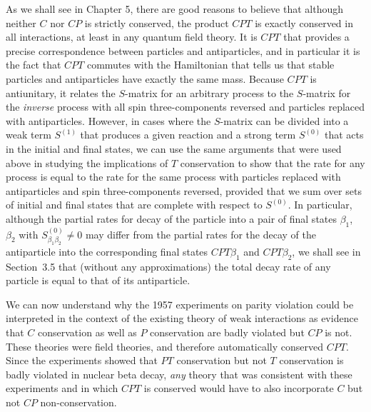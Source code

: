 As we shall see in Chapter 5, there are good reasons to believe that although neither
$C$ nor $CP$ is strictly conserved, the product $CPT$ is exactly conserved in all
interactions, at least in any quantum field theory. It is $CPT$ that provides a
precise correspondence between particles and antiparticles, and in particular it is
the fact that $CPT$ commutes with the Hamiltonian that tells us that stable particles
and antiparticles have exactly the same mass. Because $CPT$ is antiunitary, it
relates the $S$-matrix for an arbitrary process to the $S$-matrix for the
\textit{inverse} process with all spin three-components reversed and particles
replaced with antiparticles. However, in cases where the $S$-matrix can be divided
into a weak term $S^{(1)}$ that produces a given reaction and a strong term $S^{(0)}$
that acts in the initial and final states, we can use the same arguments that were
used above in studying the implications of $T$ conservation to show that the rate
for any process is equal to the rate for the same process with particles replaced
with antiparticles and spin three-components reversed, provided that we sum over
sets of initial and final states that are complete with respect to $S^{(0)}$. In
particular, although the partial rates for decay of the particle into a pair of
final states $\beta_1$, $\beta_2$ with $S^{(0)}_{\beta_1\beta_2}\ne0$ may differ
from the partial rates for the decay of the antiparticle into the corresponding
final states $CP T\beta_1$ and $CP T\beta_2$, we shall see in Section~3.5 that
(without any approximations) the total decay rate of any particle is equal to that
of its antiparticle.

We can now understand why the 1957 experiments on parity violation could be
interpreted in the context of the existing theory of weak interactions as evidence
that $C$ conservation as well as $P$ conservation are badly violated but $CP$ is
not. These theories were field theories, and therefore automatically conserved
$CPT$. Since the experiments showed that $PT$ conservation but not $T$ conservation
is badly violated in nuclear beta decay, \textit{any} theory that was consistent
with these experiments and in which $CPT$ is conserved would have to also incorporate
$C$ but not $CP$ non-conservation.
